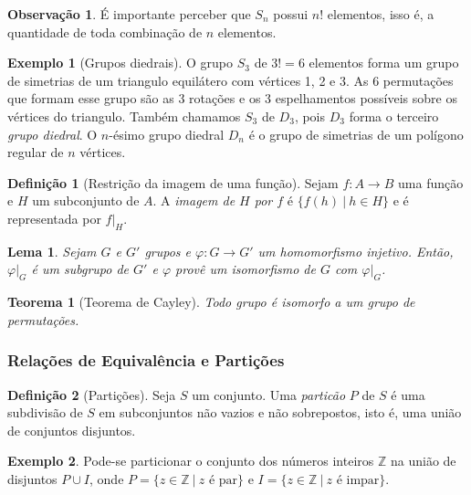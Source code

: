 \documentclass[a4paper,12pt]{report}
\theoremstyle{plain}
\newtheorem{teorema}{Teorema}[section]
\newtheorem{lema}{Lema}[section]
\theoremstyle{definition}
\newtheorem{definicao}{Definição}[section]
\newtheorem{observacao}{Observação}[section]
\newtheorem{exemplo}{Exemplo}[section]
\begin{document}
	\begin{observacao}
		É importante perceber que $S_n$ possui $n!$ elementos, isso é, a quantidade de toda combinação de $n$ elementos.
	\end{observacao}
	
	\begin{exemplo}[Grupos diedrais]
		O grupo $S_3$ de $3! = 6$ elementos forma um grupo de simetrias de um triangulo equilátero com vértices 1, 2 e 3. As 6 permutações que formam esse grupo são as 3 rotações e os 3 espelhamentos possíveis sobre os vértices do triangulo. Também chamamos $S_3$ de $D_3$, pois $D_3$ forma o terceiro \emph{grupo diedral}. 
		O $n$-ésimo grupo diedral $D_n$ é o grupo de simetrias de um polígono regular de $n$ vértices.
	\end{exemplo}
	
	\begin{definicao}[Restrição da imagem de uma função]
		Sejam $f: A\longrightarrow B$ uma função e $H$ um subconjunto de $A$. A \emph{imagem de $H$ por $f$} é $\{f(h)\ |\ h \in H\}$ e é representada por $f|_H$.
	\end{definicao}
	
	\begin{lema}
		Sejam $G$ e $G'$ grupos e $\varphi:G\longrightarrow G'$ um homomorfismo injetivo. Então, $\varphi|_G$ é um subgrupo de $G'$ e $\varphi$ provê um isomorfismo de $G$ com $\varphi|_G$.
	\end{lema}
	
	\begin{teorema}[Teorema de Cayley]
		Todo grupo é isomorfo a um grupo de permutações.
	\end{teorema}
	
	\subsubsection{Relações de Equivalência e Partições}
	
	\begin{definicao}[Partições]
		Seja \(S\) um conjunto. Uma \emph{particão} \(P\) de
		\(S\) é uma subdivisão de \(S\) em subconjuntos não vazios e não
		sobrepostos, isto é, uma união de conjuntos disjuntos.	
	\end{definicao}
	
	\begin{exemplo}
		Pode-se particionar o conjunto dos números inteiros
		\(\mathbb{Z}\) na união de disjuntos \(P\cup I\), onde
		\(P = \{z \in \mathbb{Z} \ |\ z \text{ é par}\}\) e
		\(I = \{z \in \mathbb{Z} \ |\ z \text{ é impar}\}\).
	\end{exemplo}
	
\end{document}
